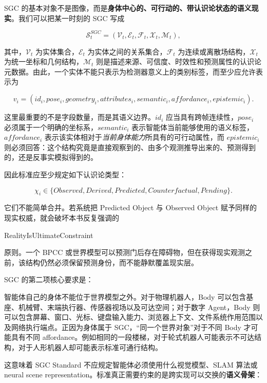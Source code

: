 SGC 的基本对象不是图像，而是\textbf{身体中心的、可行动的、带认识论状态的语义现实}。我们可以把某一时刻的 SGC 写成

\[
\mathcal S_t^{SGC}
=
\left(
\mathcal V_t,
\mathcal E_t,
\mathcal F_t,
\mathcal X_t,
\mathcal M_t
\right),
\]

其中，$\mathcal V_t$ 为实体集合，$\mathcal E_t$ 为实体之间的关系集合，$\mathcal F_t$ 为连续或离散场结构，$\mathcal X_t$ 为统一坐标和几何结构，$\mathcal M_t$ 则是描述来源、可信度、时效性和预测属性的认识论元数据。由此，一个实体不能只表示为检测器意义上的类别标签，而至少应允许表示为

\[
v_i=
(
id_i,
pose_i,
geometry_i,
attributes_i,
semantic_i,
affordance_i,
epistemic_i
).
\]

这里最重要的不是字段数量，而是其语义边界。$id_i$ 应当具有跨帧连续性，$pose_i$ 必须属于一个明确的坐标系，$semantic_i$ 表示智能体当前能够使用的语义标签，$affordance_i$ 表示该实体相对于\emph{当前身体能力}所具有的可行动属性，而 $epistemic_i$ 则必须回答：这个结构究竟是直接观察到的、由多个观测推导出来的、预测得到的，还是反事实模拟得到的。

因此标准应至少规定如下认识论类型：

\[
\chi_i
\in
\{
Observed,
Derived,
Predicted,
Counterfactual,
Pending
\}.
\]

它们不能简单合并。若系统把 Predicted Object 与 Observed Object 赋予同样的现实权威，就会破坏本书反复强调的

\begin{statementbox}
RealityIsUltimateConstraint
\end{statementbox}

原则。一个 BPCC 或世界模型可以预测门后存在障碍物，但在获得现实观测之前，该结构仍然必须保留预测身份，而不能静默覆盖现实层。

SGC 的第二项核心要求是：

\begin{statementbox}
\centering
{}
\end{statementbox}

智能体自己的身体不能位于世界模型之外。对于物理机器人，Body 可以包含基座、机械臂、末端执行器、传感器视场以及可达空间；对于数字 Agent，Body 则可以包含屏幕、窗口、光标、键盘输入能力、浏览器上下文、文件系统作用范围以及网络执行端点。正因为身体属于 SGC，``同一个世界对象''对于不同 Body 才可能具有不同 affordance。例如相同的一段楼梯，对于轮式机器人可能表示不可达结构，对于人形机器人却可能表示标准可通行结构。

这意味着 SGC Standard 不应规定智能体必须使用什么视觉模型、SLAM 算法或 neural scene representation。标准真正需要约束的是跨实现可以交换的\textbf{语义骨架}：

